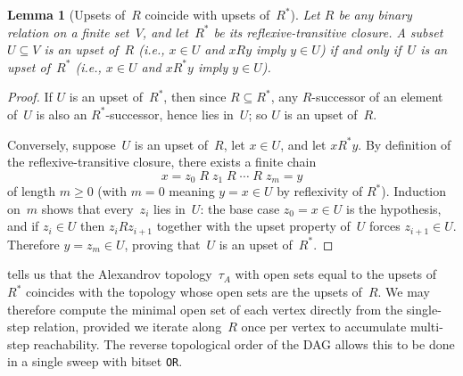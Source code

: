 \documentclass[11pt,a4paper]{article}
\theoremstyle{plain}
\newtheorem{lemma}[theorem]{Lemma}
\theoremstyle{definition}
\begin{document}
\begin{lemma}[Upsets of~$R$ coincide with upsets of~$R^{*}$]%
\label{lem:upsets-R-Rstar}
Let $R$ be any binary relation on a finite set~$V$, and let~$R^{*}$ be its
reflexive-transitive closure.  A subset $U \subseteq V$ is an upset of~$R$
(i.e., $x \in U$ and $x R y$ imply $y \in U$) if and only if~$U$ is an upset
of~$R^{*}$ (i.e., $x \in U$ and $x R^{*} y$ imply $y \in U$).
\end{lemma}

\begin{proof}
If $U$ is an upset of~$R^{*}$, then since $R \subseteq R^{*}$, any
$R$-successor of an element of~$U$ is also an $R^{*}$-successor, hence lies
in~$U$; so $U$ is an upset of~$R$.

Conversely, suppose~$U$ is an upset of~$R$, let $x \in U$, and let
$x R^{*} y$.  By definition of the reflexive-transitive closure, there
exists a finite chain
\[
  x = z_0 \; R \; z_1 \; R \; \cdots \; R \; z_m = y
\]
of length $m \geq 0$ (with $m = 0$ meaning $y = x \in U$ by reflexivity of
$R^{*}$).  Induction on~$m$ shows that every~$z_i$ lies
in~$U$: the base case $z_0 = x \in U$ is the hypothesis, and if
$z_i \in U$ then $z_i R z_{i+1}$ together with the upset property of~$U$
forces $z_{i+1} \in U$.  Therefore $y = z_m \in U$, proving that~$U$ is an
upset of~$R^{*}$.
\end{proof}

 tells us that the Alexandrov topology~$\tau_A$
with open sets equal to the upsets of~$R^{*}$ coincides with the topology
whose open sets are the upsets of~$R$.  We may therefore compute the
minimal open set of each vertex directly from the single-step relation,
provided we iterate along~$R$ once per vertex to accumulate multi-step
reachability.  The reverse topological order of the DAG allows this to be
done in a single sweep with bitset \texttt{OR}.
\end{document}

